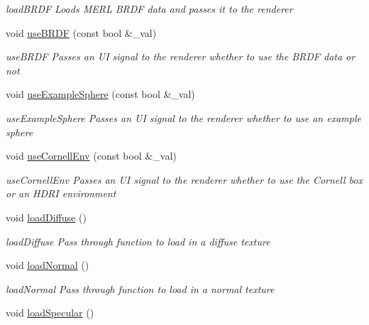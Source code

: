 \begin{DoxyCompactItemize}
\begin{DoxyCompactList}\small\item\em load\-B\-R\-D\-F Loads M\-E\-R\-L B\-R\-D\-F data and passes it to the renderer \end{DoxyCompactList}\item 
void \hyperlink{classNGLScene_abee07cadf7d9342fa40e68576130b2ad}{use\-B\-R\-D\-F} (const bool \&\-\_\-val)
\begin{DoxyCompactList}\small\item\em use\-B\-R\-D\-F Passes an U\-I signal to the renderer whether to use the B\-R\-D\-F data or not \end{DoxyCompactList}\item 
void \hyperlink{classNGLScene_a2e02406936e4cbd1756301836533e476}{use\-Example\-Sphere} (const bool \&\-\_\-val)
\begin{DoxyCompactList}\small\item\em use\-Example\-Sphere Passes an U\-I signal to the renderer whether to use an example sphere \end{DoxyCompactList}\item 
void \hyperlink{classNGLScene_aa6b13cd9be96a0fb83224eca63ca9ca1}{use\-Cornell\-Env} (const bool \&\-\_\-val)
\begin{DoxyCompactList}\small\item\em use\-Cornell\-Env Passes an U\-I signal to the renderer whether to use the Cornell box or an H\-D\-R\-I environment \end{DoxyCompactList}\item 
\hypertarget{classNGLScene_a17174c3763736bc8e5de55eb551e91dd}{void \hyperlink{classNGLScene_a17174c3763736bc8e5de55eb551e91dd}{load\-Diffuse} ()}\label{classNGLScene_a17174c3763736bc8e5de55eb551e91dd}

\begin{DoxyCompactList}\small\item\em load\-Diffuse Pass through function to load in a diffuse texture \end{DoxyCompactList}\item 
\hypertarget{classNGLScene_a9e19c5d383822133d99d2c5359406ee8}{void \hyperlink{classNGLScene_a9e19c5d383822133d99d2c5359406ee8}{load\-Normal} ()}\label{classNGLScene_a9e19c5d383822133d99d2c5359406ee8}

\begin{DoxyCompactList}\small\item\em load\-Normal Pass through function to load in a normal texture \end{DoxyCompactList}\item 
\hypertarget{classNGLScene_a660fd684af6638405e2acefbd85c5508}{void \hyperlink{classNGLScene_a660fd684af6638405e2acefbd85c5508}{load\-Specular} ()}\label{classNGLScene_a660fd684af6638405e2acefbd85c5508}


\end{DoxyCompactItemize}
